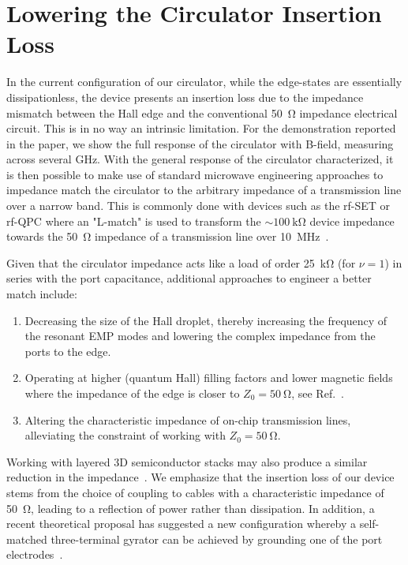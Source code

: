 \section{Lowering the Circulator Insertion Loss}
\label{sec:qhe_match}
In the current configuration of our circulator, while the edge-states are essentially dissipationless, the device presents an insertion loss due to the impedance mismatch between the Hall edge and the conventional \SI{50}{\ohm} impedance electrical circuit. This is in no way an intrinsic limitation. For the demonstration reported in the paper, we show the full response of the circulator with B-field, measuring across several GHz. With the general response of the circulator characterized, it is then possible to make use of standard microwave engineering approaches to impedance match the circulator to the arbitrary impedance of a transmission line over a narrow band. This is commonly done with devices such as the rf-SET or rf-QPC where an "L-match" is used to transform the $\sim \SI{100}{\kilo\ohm}$ device impedance towards the \SI{50}{\ohm} impedance of a transmission line over \SI{10}{\mega\hertz}~\cite{Reilly:2007ig,barthel2009rapid}.

Given that the circulator impedance acts like a load of order \SI{25}{\kilo\ohm} (for $\nu=1$) in series with the port capacitance, additional approaches to engineer a better match include:
\begin{enumerate}
\item Decreasing the size of the Hall droplet, thereby increasing the frequency of the resonant EMP modes and lowering the complex impedance from the ports to the edge.
\item Operating at higher (quantum Hall) filling factors and lower magnetic fields where the impedance of the edge is closer to $Z_0 = \SI{50}{\ohm}$, see Ref.~\cite{placke2016model}.
\item Altering the characteristic impedance of on-chip transmission lines, alleviating the constraint of working with $Z_0 = \SI{50}{\ohm}$.
\end{enumerate}
Working with layered 3D semiconductor stacks may also produce a similar reduction in the impedance~\cite{druist1998observation}. We emphasize that the insertion loss of our device stems from the choice of coupling to cables with a characteristic impedance of \SI{50}{\ohm}, leading to a reflection of power rather than dissipation. In addition, a recent theoretical proposal has suggested a new configuration whereby a self-matched three-terminal gyrator can be achieved by grounding one of the port electrodes~\cite{bosco2016self}.

